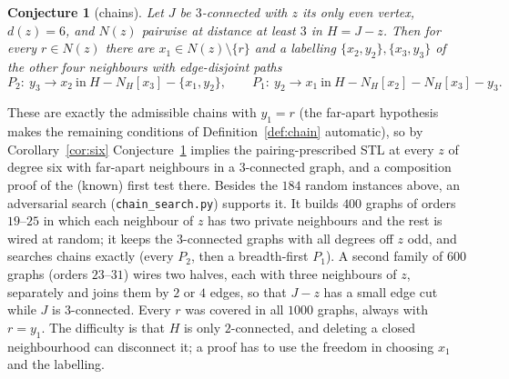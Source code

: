 \documentclass[11pt]{amsart}
\newtheorem{conjecture}[theorem]{Conjecture}
\theoremstyle{definition}
\begin{document}
\begin{conjecture}[chains]\label{conj:chains}
Let $J$ be $3$-connected with $z$ its only even vertex, $d(z)=6$, and $N(z)$ pairwise at distance
at least $3$ in $H=J-z$. Then for every $r\in N(z)$ there are $x_1\in N(z)\setminus\{r\}$ and a
labelling $\{x_2,y_2\},\{x_3,y_3\}$ of the other four neighbours with edge-disjoint paths
\[
P_2:\ y_3\to x_2\ \text{in}\ H-N_H[x_3]-\{x_1,y_2\},\qquad
P_1:\ y_2\to x_1\ \text{in}\ H-N_H[x_2]-N_H[x_3]-y_3.
\]
\end{conjecture}

These are exactly the admissible chains with $y_1=r$ (the far-apart hypothesis makes the
remaining conditions of Definition~\ref{def:chain} automatic), so by Corollary~\ref{cor:six}
Conjecture~\ref{conj:chains} implies the pairing-prescribed STL at every $z$ of degree six with
far-apart neighbours in a $3$-connected graph, and a composition proof of the (known) first test
there. Besides the $184$ random instances above, an adversarial
search (\texttt{chain\_search.py}) supports it. It builds $400$ graphs of orders $19$--$25$ in
which each neighbour of $z$ has two private neighbours and the rest is wired at random; it keeps
the $3$-connected graphs with all degrees off $z$ odd, and searches chains exactly (every $P_2$,
then a breadth-first $P_1$). A second family of $600$ graphs (orders $23$--$31$) wires two halves,
each with three neighbours of $z$, separately and joins them by $2$ or $4$ edges, so that $J-z$
has a small edge cut while $J$ is $3$-connected. Every $r$ was covered in all $1000$ graphs,
always with $r=y_1$. The difficulty is that
$H$ is only $2$-connected, and deleting a closed neighbourhood can disconnect it; a proof has to
use the freedom in choosing $x_1$ and the labelling.
\end{document}
